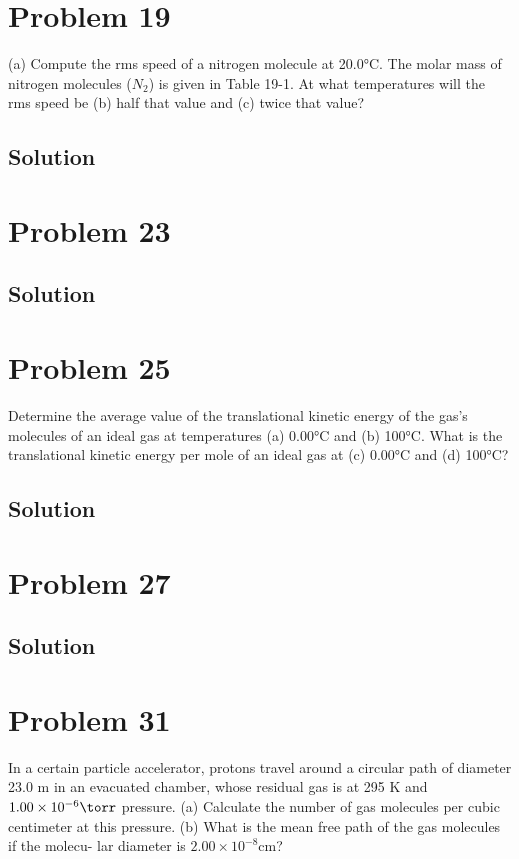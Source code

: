 \documentclass[12pt]{article}
\begin{document}
    \pagebreak
    \section{Problem 19}
        (a) Compute the rms speed of a nitrogen molecule at 20.0\unit{\celsius}. 
        The molar mass of nitrogen molecules ($N_2$) is given in Table 19-1.
        At what temperatures will the rms speed be (b) half that value and (c) twice that value?

        \subsection{Solution}

    \pagebreak
    \section{Problem 23}

        \subsection{Solution}

    \pagebreak
    \section{Problem 25}
        Determine the average value of the translational kinetic energy of the gas's molecules of an ideal gas at temperatures (a) 0.00\unit{\celsius} and (b) 100\unit{\celsius}.
        What is the translational kinetic energy per mole of an ideal gas at (c) 0.00\unit{\celsius} and (d) 100\unit{\celsius}?

        \subsection{Solution}

    \pagebreak
    \section{Problem 27}

        \subsection{Solution}

    \pagebreak
    \section{Problem 31}
        In a certain particle accelerator, protons travel around a circular path of diameter 23.0 m in an evacuated chamber, whose residual gas is at 295 K and $1.00 \times 10^{-6} \unit{\torr}$ pressure. (a) Calculate the number of gas molecules per cubic centimeter at this pressure.
(b) What is the mean free path of the gas molecules if the molecu-
lar diameter is $2.00 \times 10^{-8} \unit{\centi\meter}$?
\end{document}
